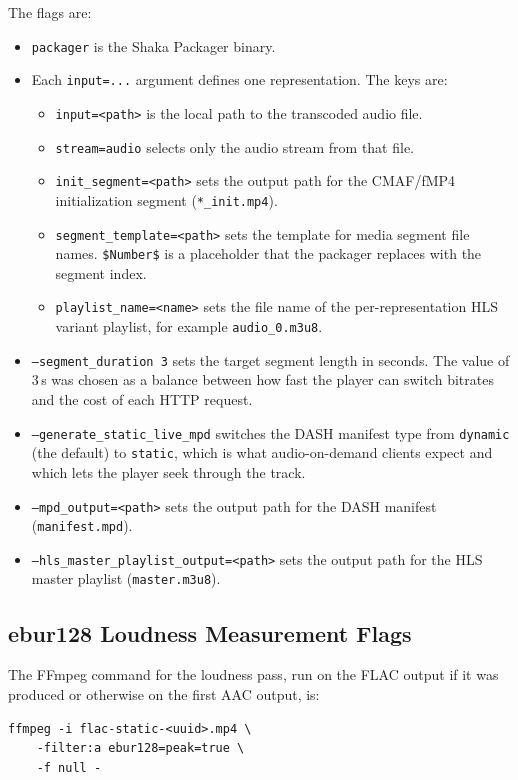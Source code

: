 The flags are:
\begin{itemize}
    \item \texttt{packager} is the Shaka Packager binary.
    \item Each \texttt{input=...} argument defines one
    representation. The keys are:
    \begin{itemize}
        \item \texttt{input=<path>} is the local path to the
        transcoded audio file.
        \item \texttt{stream=audio} selects only the audio stream
        from that file.
        \item \texttt{init\_segment=<path>} sets the output path
        for the CMAF/fMP4 initialization segment
        (\texttt{*\_init.mp4}).
        \item \texttt{segment\_template=<path>} sets the template
        for media segment file names. \texttt{\$Number\$} is a
        placeholder that the packager replaces with the segment
        index.
        \item \texttt{playlist\_name=<name>} sets the file name of
        the per-representation HLS variant playlist, for example
        \texttt{audio\_0.m3u8}.
    \end{itemize}
    \item \texttt{--segment\_duration 3} sets the target segment
    length in seconds. The value of 3\,s was chosen as a balance
    between how fast the player can switch bitrates and the cost
    of each HTTP request.
    \item \texttt{--generate\_static\_live\_mpd} switches the DASH
    manifest type from \texttt{dynamic} (the default) to
    \texttt{static}, which is what audio-on-demand clients expect
    and which lets the player seek through the track.
    \item \texttt{--mpd\_output=<path>} sets the output path for
    the DASH manifest (\texttt{manifest.mpd}).
    \item \texttt{--hls\_master\_playlist\_output=<path>} sets the
    output path for the HLS master playlist (\texttt{master.m3u8}).
\end{itemize}

\subsection{ebur128 Loudness Measurement Flags}
The FFmpeg command for the loudness pass, run on the FLAC output
if it was produced or otherwise on the first AAC output, is:
\begin{verbatim}
ffmpeg -i flac-static-<uuid>.mp4 \
    -filter:a ebur128=peak=true \
    -f null -
\end{verbatim}

